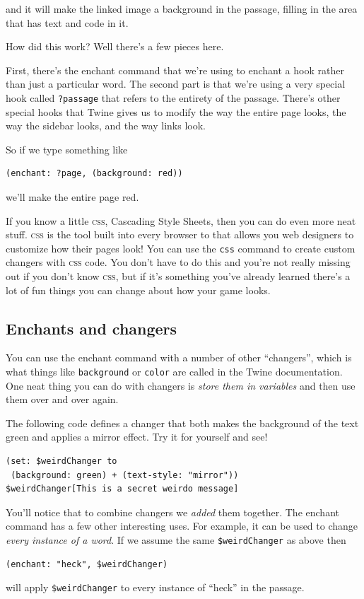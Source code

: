 \documentclass[a5paper,11pt]{article}
\begin{document}
and it will make the linked image a background in the passage, filling in the area that has text and code in it.

How did this work? Well there's a few pieces here.

First, there's the enchant command that we're using to enchant a hook rather than just a particular word. The second part is that we're using a very special hook called \verb"?passage" that refers to the entirety of the passage. There's other special hooks that Twine gives us to modify the way the entire page looks, the way the sidebar looks, and the way links look.

So if we type something like
\begin{verbatim}
(enchant: ?page, (background: red))
\end{verbatim}
we'll make the entire page red.

If you know a little \textsc{css}, Cascading Style Sheets, then you can do even more neat stuff. \textsc{css} is the tool built into every browser to that allows you web designers to customize how their pages look! You can use the \verb|css| command to create custom changers with \textsc{css} code. You don't have to do this and you're not really missing out if you don't know \textsc{css}, but if it's something you've already learned there's a lot of fun things you can change about how your game looks. 
\subsection{Enchants and changers}
You can use the enchant command with a number of other ``changers'', which is what things like \verb|background| or \verb|color| are called in the Twine documentation. One neat thing you can do with changers is \emph{store them in variables} and then use them over and over again.

The following code defines a changer that both makes the background of the text green and applies a mirror effect. Try it for yourself and see!
\begin{verbatim}
(set: $weirdChanger to 
 (background: green) + (text-style: "mirror"))
$weirdChanger[This is a secret weirdo message]
\end{verbatim}

You'll notice that to combine changers we \emph{added} them together. The enchant command has a few other interesting uses. For example, it can be used to change \emph{every instance of a word}. If we assume the same \verb|$weirdChanger| as above then
\begin{verbatim}
(enchant: "heck", $weirdChanger)
\end{verbatim}
will apply \verb|$weirdChanger| to every instance of ``heck'' in the passage. 
\end{document}
